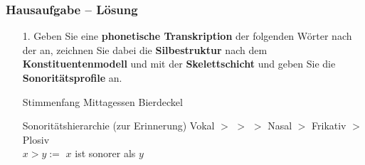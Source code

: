 
\begin{frame}%
\frametitle{Hausaufgabe -- Lösung}
\begin{itemize}

\item[1.] Geben Sie eine \textbf{phonetische Transkription} der folgenden Wörter nach der  an, zeichnen Sie dabei die \textbf{Silbestruktur} nach dem \textbf{Konstituentenmodell} und mit der \textbf{Skelettschicht} und geben Sie die \textbf{Sonoritätsprofile} an.

\begin{exe}
\exi{(\ref{ex:03cHA1})}
\begin{xlist}
\ex Stimmenfang
\ex Mittagessen
\ex Bierdeckel
\end{xlist}
\end{exe}

\begin{block}{Sonoritätshierarchie (zur Erinnerung)}
Vokal $>$ \textipa{/\textscr /} $>$  $>$ Nasal $>$ Frikativ $>$ Plosiv \\
$x > y :=$ $x$ ist sonorer als $y$
\end{block}

\end{itemize}
\end{frame}

